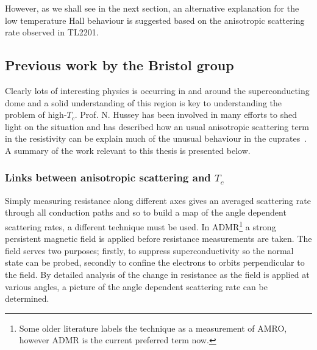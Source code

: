 However, as we shall see in the next section, an alternative explanation for the low temperature Hall behaviour is suggested based on the anisotropic scattering rate observed in \acf{TL2201}.





\subsection{Previous work by the Bristol group}

Clearly lots of interesting physics is occurring in and around the superconducting dome and a solid understanding of this region is key to understanding the problem of high-$T_c$. Prof. N. Hussey has been involved in many efforts to shed light on the situation and has described how an usual anisotropic scattering term in the resistivity can be explain much of the unusual behaviour in the cuprates~\cite{Hussey2003b, Hussey2011a, Hussey2008}. A summary of the work relevant to this thesis is presented below.

\subsubsection{Links between anisotropic scattering and $T_c$}
    \label{Sec:Intro:AnisotropicScattering}

Simply measuring resistance along different axes gives an averaged scattering rate through all conduction paths and so to build a map of the angle dependent scattering rates, a different technique must be used. In \ac{ADMR}\footnote{Some older literature labels the technique as a measurement of \ac{AMRO}, however \ac{ADMR} is the current preferred term now.} a strong persistent magnetic field is applied before resistance measurements are taken. The field serves two purposes; firstly, to suppress superconductivity so the normal state can be probed, secondly to confine the electrons to orbits perpendicular to the field. By detailed analysis of the change in resistance as the field is applied at various angles, a picture of the angle dependent scattering rate can be determined.

